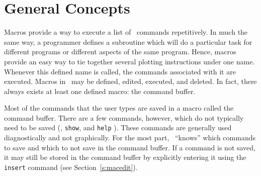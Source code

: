 %
%

\section		{General Concepts}

Macros provide a way to execute a list of \wip\ commands
repetitively.
In much the same way,
a programmer defines a subroutine
which will do a particular task for different programs or different
aspects of the same program.
Hence, macros provide an easy way to tie together several plotting
instructions under one name.
Whenever this defined name is called,
the commands associated with it are executed.
Macros in \wip\ may be defined, edited, executed, and deleted.
In fact, there always exists at least one defined macro:
the command buffer.

Most of the commands that the user types are saved in a macro called the
command buffer.
There are a few commands, however, which do not typically need to be saved
(,
{\tt show},
and {\tt help}%
).
These commands are generally used diagnostically and not graphically.
For the most part, \wip\ ``knows'' which commands to save and which to
not save in the command buffer.
If a command is not saved, it may still be stored in the command
buffer by explicitly entering it using the
{\tt insert}%
command (see Section~\ref{s:macedit}).

